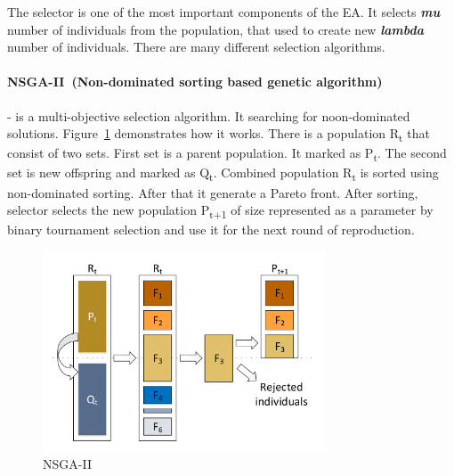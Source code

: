 The selector is one of the most important components of the EA. It selects \textit{\textbf{mu}} number of individuals from the population, that used to create new \textit{\textbf{lambda}} number of individuals. There are many different selection algorithms.


\paragraph{NSGA-II~(Non-dominated sorting based genetic algorithm)~\cite{deb2000}} - is a multi-objective selection algorithm. It searching for noon-dominated solutions. Figure~\ref{fig:nsga2} demonstrates how it works. There is a population \texorpdfstring{R\textsubscript{t}}{R t} that consist of two sets. First set is a parent population. It marked as \texorpdfstring{P\textsubscript{t}}{P t}. The second set is new offspring and marked as \texorpdfstring{Q\textsubscript{t}}{Q t}. Combined population \texorpdfstring{R\textsubscript{t}}{R t} is sorted using non-dominated sorting. After that it generate a Pareto front. After sorting, selector selects the new population \texorpdfstring{P\textsubscript{t+1}}{P t+1} of size represented as a parameter by binary tournament selection and use it for the next round of reproduction.

\begin{figure}
	\centering
	\includegraphics[width=0.75\textwidth]{images/nsga2.pdf}
	\caption[NSGA-II]{NSGA-II}
	\label{fig:nsga2}
\end{figure}

